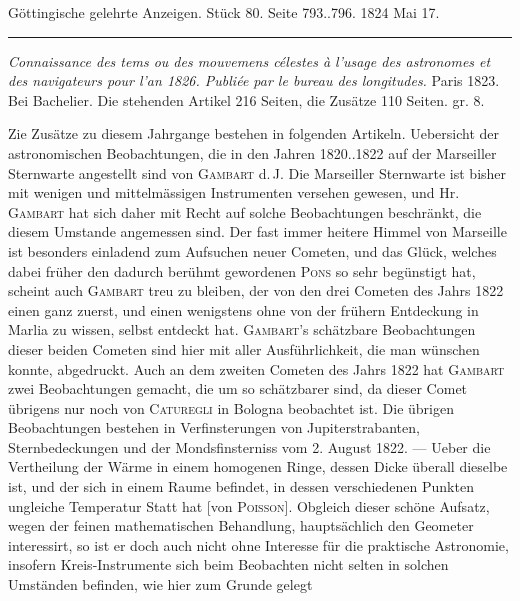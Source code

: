 \par\bigskip
\hypertarget{native-643-lower}{}
\begin{center}\small Göttingische gelehrte Anzeigen. Stück 80. Seite 793..796. 1824 Mai 17.\\[3pt]\rule{.72\linewidth}{.3pt}\end{center}

\emph{Connaissance des tems ou des mouvemens célestes à l'usage des astronomes et des navigateurs pour l'an \textup{1826}. Publiée par le bureau des longitudes.} Paris 1823. Bei Bachelier. Die stehenden Artikel 216 Seiten, die Zusätze 110 Seiten. gr. 8.

Zie Zusätze zu diesem Jahrgange bestehen in folgenden Artikeln. Uebersicht der astronomischen Beobachtungen, die in den Jahren 1820..1822 auf der Marseiller Sternwarte angestellt sind von \textsc{Gambart} d.\,J. Die Marseiller Sternwarte ist bisher mit wenigen und mittelmässigen Instrumenten versehen gewesen, und Hr. \textsc{Gambart} hat sich daher mit Recht auf solche Beobachtungen beschränkt, die diesem Umstande angemessen sind. Der fast immer heitere Himmel von Marseille ist besonders einladend zum Aufsuchen neuer Cometen, und das Glück, welches dabei früher den dadurch berühmt gewordenen \textsc{Pons} so sehr begünstigt hat, scheint auch \textsc{Gambart} treu zu bleiben, der von den drei Cometen des Jahrs 1822 einen ganz zuerst, und einen wenigstens ohne von der frühern Entdeckung in Marlia zu wissen, selbst entdeckt hat. \textsc{Gambart}'s schätzbare Beobachtungen dieser beiden Cometen sind hier mit aller Ausführlichkeit, die man wünschen konnte, abgedruckt. Auch an dem zweiten Cometen des Jahrs 1822 hat \textsc{Gambart} zwei Beobachtungen gemacht, die um so schätzbarer sind, da dieser Comet übrigens nur noch von \textsc{Caturegli} in Bologna beobachtet ist. Die übrigen Beobachtungen bestehen in Verfinsterungen von Jupiterstrabanten, Sternbedeckungen und der Mondsfinsterniss vom 2. August 1822. --- Ueber die Vertheilung der Wärme in einem homogenen Ringe, dessen Dicke überall dieselbe ist, und der sich in einem Raume befindet, in dessen verschiedenen Punkten ungleiche Temperatur Statt hat [von \textsc{Poisson}]. Obgleich dieser schöne Aufsatz, wegen der feinen mathematischen Behandlung, hauptsächlich den Geometer interessirt, so ist er doch auch nicht ohne Interesse für die praktische Astronomie, insofern Kreis-Instrumente sich beim Beobachten nicht selten in solchen Umständen befinden, wie hier zum Grunde gelegt\par
\clearpage
\thispagestyle{empty}
